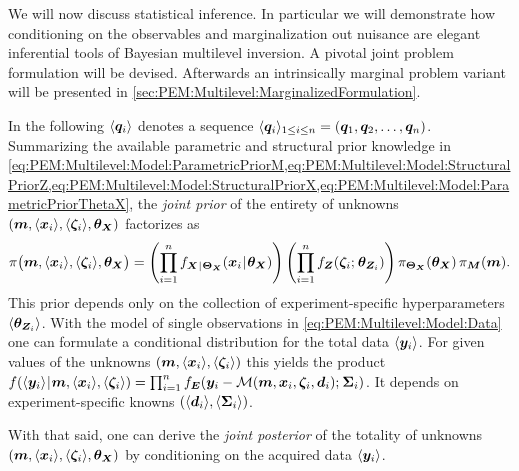 We will now discuss statistical inference.
In particular we will demonstrate how conditioning on the observables and marginalization out nuisance are elegant inferential tools of Bayesian multilevel inversion.
A pivotal joint problem formulation will be devised.
Afterwards an intrinsically marginal problem variant will be presented in \cref{sec:PEM:Multilevel:MarginalizedFormulation}.
\par %
In the following \(\langle{\bm{q}_i}\rangle\) denotes a sequence \(\langle{\bm{q}_i}\rangle_{1 \leq i \leq n} = (\bm{q}_1,\bm{q}_2,\ldots,\bm{q}_n)\).
Summarizing the available parametric and structural prior knowledge in \cref{eq:PEM:Multilevel:Model:ParametricPriorM,eq:PEM:Multilevel:Model:StructuralPriorZ,eq:PEM:Multilevel:Model:StructuralPriorX,eq:PEM:Multilevel:Model:ParametricPriorThetaX},
the \textit{joint prior} of the entirety of unknowns \((\bm{m},\langle{\bm{x}_i}\rangle,\langle{\bm{\zeta}_i}\rangle,\bm{\theta}_{\bm{X}})\) factorizes as
\begin{equation} \label{eq:PEM:Multilevel:Inference:JointPrior}
  \pi \big( \bm{m},\langle{\bm{x}_i}\rangle,\langle{\bm{\zeta}_i}\rangle,\bm{\theta}_{\bm{X}} \big)
  = \left( \prod\limits_{i=1}^n f_{\bm{X} {\:\!}|{\:\!} \bm{\Theta}_{\bm{X}}} (\bm{x}_i {\:\!}|{\:\!} \bm{\theta}_{\bm{X}}) \right)
  \left( \prod\limits_{i=1}^n f_{\bm{Z}}(\bm{\zeta}_i ;{\:\!} \bm{\theta}_{\bm{Z}_i}) \right)
  \pi_{\bm{\Theta}_{\bm{X}}} (\bm{\theta}_{\bm{X}}) \, \pi_{\bm{M}} (\bm{m}).
\end{equation}
This prior depends only on the collection of experiment-specific hyperparameters \(\langle{\bm{\theta}_{\bm{Z}_i}}\rangle\).
With the model of single observations in \cref{eq:PEM:Multilevel:Model:Data} one can formulate a conditional distribution for the total data \(\langle{\bm{y}_i}\rangle\).
For given values of the unknowns \((\bm{m},\langle{\bm{x}_i}\rangle,\langle{\bm{\zeta}_i}\rangle)\) this yields the product
\(f (\langle{\bm{y}_i}\rangle {\:\!}|{\:\!} \bm{m},\langle{\bm{x}_i}\rangle,\langle{\bm{\zeta}_i}\rangle) = \prod_{i=1}^n f_{\bm{E}} (\bm{y}_i-\mathcal{M}(\bm{m},\bm{x}_i,\bm{\zeta}_i,\bm{d}_i) ;{\:\!} \bm{\Sigma}_i)\).
It depends on experiment-specific knowns \((\langle{\bm{d}_i}\rangle,\langle{\bm{\Sigma}_i}\rangle)\).
\par %
With that said, one can derive the \textit{joint posterior} of the totality of unknowns \((\bm{m},\langle{\bm{x}_i}\rangle,\langle{\bm{\zeta}_i}\rangle,\bm{\theta}_{\bm{X}})\) by conditioning on the acquired data \(\langle{\bm{y}_i}\rangle\).
